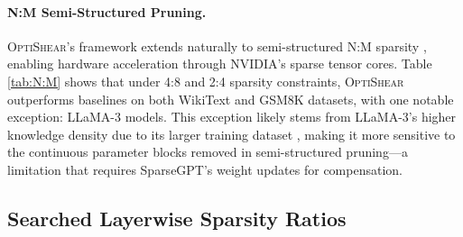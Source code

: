 \paragraph{N:M Semi-Structured Pruning.}
\textsc{OptiShear}'s framework extends naturally to semi-structured N:M sparsity \citep{mishra2021accelerating}, enabling hardware acceleration through NVIDIA's sparse tensor cores. Table \ref{tab:N:M} shows that under 4:8 and 2:4 sparsity constraints, \textsc{OptiShear} outperforms baselines on both WikiText and GSM8K datasets, with one notable exception: LLaMA-3 models. This exception likely stems from LLaMA-3's higher knowledge density due to its larger training dataset \citep{llama3}, making it more sensitive to the continuous parameter blocks removed in semi-structured pruning—a limitation that requires SparseGPT's weight updates for compensation.


\subsection{Searched Layerwise Sparsity Ratios}

